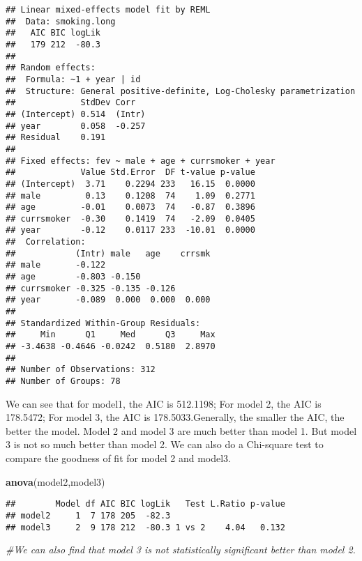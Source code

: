 \documentclass[]{book}
\newenvironment{Shaded}{\begin{snugshade}}{\end{snugshade}}
\newcommand{\KeywordTok}[1]{\textcolor[rgb]{0.13,0.29,0.53}{\textbf{#1}}}
\newcommand{\CommentTok}[1]{\textcolor[rgb]{0.56,0.35,0.01}{\textit{#1}}}
\newcommand{\NormalTok}[1]{#1}
\theoremstyle{definition}
\theoremstyle{definition}
\theoremstyle{definition}
\theoremstyle{remark}
\begin{document}
\begin{verbatim}
## Linear mixed-effects model fit by REML
##  Data: smoking.long 
##   AIC BIC logLik
##   179 212  -80.3
## 
## Random effects:
##  Formula: ~1 + year | id
##  Structure: General positive-definite, Log-Cholesky parametrization
##             StdDev Corr  
## (Intercept) 0.514  (Intr)
## year        0.058  -0.257
## Residual    0.191        
## 
## Fixed effects: fev ~ male + age + currsmoker + year 
##             Value Std.Error  DF t-value p-value
## (Intercept)  3.71    0.2294 233   16.15  0.0000
## male         0.13    0.1208  74    1.09  0.2771
## age         -0.01    0.0073  74   -0.87  0.3896
## currsmoker  -0.30    0.1419  74   -2.09  0.0405
## year        -0.12    0.0117 233  -10.01  0.0000
##  Correlation: 
##            (Intr) male   age    crrsmk
## male       -0.122                     
## age        -0.803 -0.150              
## currsmoker -0.325 -0.135 -0.126       
## year       -0.089  0.000  0.000  0.000
## 
## Standardized Within-Group Residuals:
##     Min      Q1     Med      Q3     Max 
## -3.4638 -0.4646 -0.0242  0.5180  2.8970 
## 
## Number of Observations: 312
## Number of Groups: 78
\end{verbatim}

We can see that for model1, the AIC is 512.1198; For model 2, the AIC is
178.5472; For model 3, the AIC is 178.5033.Generally, the smaller the
AIC, the better the model. Model 2 and model 3 are much better than
model 1. But model 3 is not so much better than model 2. We can also do
a Chi-square test to compare the goodness of fit for model 2 and model3.

\begin{Shaded}
\begin{Highlighting}[]
\KeywordTok{anova}\NormalTok{(model2,model3)}
\end{Highlighting}
\end{Shaded}

\begin{verbatim}
##        Model df AIC BIC logLik   Test L.Ratio p-value
## model2     1  7 178 205  -82.3                       
## model3     2  9 178 212  -80.3 1 vs 2    4.04   0.132
\end{verbatim}

\begin{Shaded}
\begin{Highlighting}[]
\CommentTok{#We can also find that model 3 is not statistically significant better than model 2.}
\end{Highlighting}
\end{Shaded}
\end{document}
